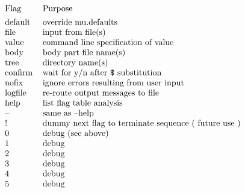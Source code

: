 \[\begin{tabular}{ll}
Flag    &       Purpose\\[1ex]

default &       override mu.defaults\\
file    &       input from file(s)\\
value   &       command line specification of value\\
body    &       body part file name(s)\\
tree    &       directory name(s)\\
confirm &       wait for y/n after \verb+$+ substitution\\
nofix   &       ignore errors resulting from user input\\
logfile &       re-route output messages to file\\
help    &       list flag table analysis\\
--      &       same as --help\\
!       &       dummy next flag to terminate sequence ( future use )\\
0       &       debug (see above)\\
1       &       debug\\
2       &       debug\\
3       &       debug\\
4       &       debug\\
5       &       debug\\

\end{tabular}\]
